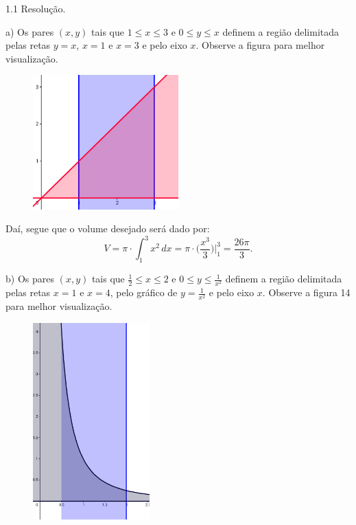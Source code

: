 \documentclass{article}
\begin{document}
{\begin{newpage}
\begin{flushleft}
1.1 Resolução.
\end{flushleft}
\par a) Os pares $(x,y)$ tais que $\displaystyle{1\leq x\leq 3}$ e $\displaystyle{0\leq y\leq x}$ definem a região delimitada pelas retas $y=x$, $x=1$ e $x=3$ e pelo eixo $x$. Observe a figura para melhor visualização.
\begin{figure}[htbp]
\begin{center}
\includegraphics[width=0.5\textwidth, angle=0]{Grafico17.png}
\end{center}
\end{figure}
\par Daí, segue que o volume desejado será dado por:
\begin{equation*}\displaystyle{V = \pi\cdot\int_{1}^{3} x^{2}\, dx = \pi\cdot \Big(\frac{x^{3}}{3}\Big)\Big|^{3}_{1} = \frac{26\pi }{3}.}\end{equation*}
\par
\vspace{0.3cm}
b) Os pares $(x,y)$ tais que $\displaystyle{\frac{1}{2}\leq x\leq 2}$ e $\displaystyle{0\leq y\leq \frac{1}{x^2}}$ definem a região delimitada pelas retas $x=1$ e $x=4$, pelo gráfico de $y=\displaystyle{\frac{1}{x^2}}$ e pelo eixo $x$. Observe a figura 14 para melhor visualização.
\begin{figure}[htbp]
\begin{center}
\includegraphics[width=0.4\textwidth, angle=0]{Grafico18.png}

\end{center}
\end{figure}
\end{newpage}}
\end{document}
